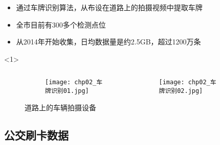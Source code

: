 \begin{frame}[t]{\subsecname}
\begin{itemize}
\item<1-> 通过车牌识别算法，从布设在道路上的拍摄视频中提取车牌
\item<2-> 全市目前有300多个检测点位
\item<2-> 从2014年开始收集，日均数据量是约2.5GB，超过1200万条 
\end{itemize}


\begin{onlyenv}<1>
\begin{figure} \centering
\begin{columns}[b]
  \begin{column}{.5\textwidth}
    \begin{figure}\flushright
      \texttt{[image: chp02\_车牌识别01.jpg]}
    \end{figure}
  \end{column}
  \begin{column}{.5\textwidth}
    \begin{figure}\flushleft
      \texttt{[image: chp02\_车牌识别02.jpg]}
    \end{figure}
  \end{column}
\end{columns}
\caption{道路上的车辆拍摄设备} 
\end{figure}
\end{onlyenv}

\end{frame}

\subsection{公交刷卡数据}

